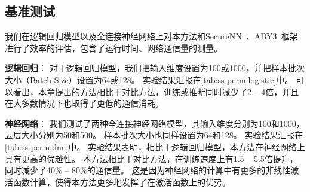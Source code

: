 \subsection{基准测试}
我们在逻辑回归模型以及全连接神经网络上对本方法和SecureNN~\cite{wagh2019securenn}、ABY3~\cite{mohassel2018aby3}框架进行了效率的评估，包含了运行时间、网络通信量的测量。

\textbf{逻辑回归}：
对于逻辑回归模型，我们把输入维度设置为100或1000，并把样本批次大小（Batch Size）设置为64或128。
实验结果汇报在\ref{tab:ss-perm:logistic}中。
可以看出，本章提出的方法相比于对比方法，训练或推断同时减少了2 -- 4倍，并且在大多数情况下也取得了更低的通信消耗。
%



\textbf{神经网络}：
我们测试了两种全连接神经网络模型，其输入维度分别为100和1000，云层大小分别为50和500。
样本批次大小也同样设置为64和128。
实验结果汇报在\ref{tab:ss-perm:dnn}中。
%
实验结果表明，相比于逻辑回归模型，本方法在神经网络上具有更高的优越性。
本方法相比于对比方法，在训练速度上有1.5 -- 5.5倍提升，同时减少了40\% -- 80\%的通信量。
这是因为神经网络的计算中有更多的非线性激活函数计算，使得本方法更多地发挥了在激活函数上的优势。
%



